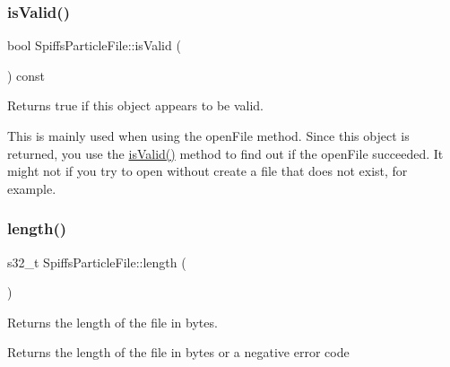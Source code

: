 \mbox{\label{class_spiffs_particle_file_aa47bab32911760edd8477bcd54f1271d}} 
\subsubsection{\texorpdfstring{is\+Valid()}{isValid()}}
{\footnotesize\ttfamily bool Spiffs\+Particle\+File\+::is\+Valid (\begin{DoxyParamCaption}{ }\end{DoxyParamCaption}) const\hspace{0.3cm}{\ttfamily [inline]}}



Returns true if this object appears to be valid. 

This is mainly used when using the open\+File method. Since this object is returned, you use the \mbox{\hyperlink{class_spiffs_particle_file_aa47bab32911760edd8477bcd54f1271d}{is\+Valid()}} method to find out if the open\+File succeeded. It might not if you try to open without create a file that does not exist, for example. \mbox{\label{class_spiffs_particle_file_ab8b0e24661334106f1eef15bd92bf2e2}} 
\subsubsection{\texorpdfstring{length()}{length()}}
{\footnotesize\ttfamily s32\+\_\+t Spiffs\+Particle\+File\+::length (\begin{DoxyParamCaption}{ }\end{DoxyParamCaption})}



Returns the length of the file in bytes. 

\begin{DoxyReturn}{Returns}
the length of the file in bytes or a negative error code 
\end{DoxyReturn}
\mbox{\label{class_spiffs_particle_file_a5aeceaf038f055a50376a500dfb27856}} 
